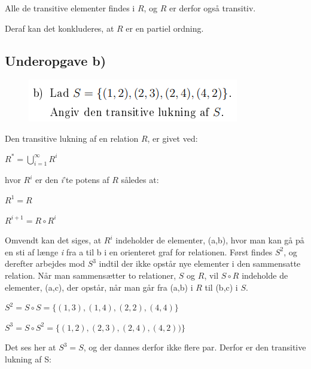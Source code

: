 \documentclass{article}
\begin{document}
Alle de transitive elementer findes i $R$, og $R$ er derfor også transitiv.

Deraf kan det konkluderes, at $R$ er en partiel ordning.

\subsection{Underopgave b)}

\begin{figure}[h]
\begin{center}
\includegraphics[scale=0.9]{2015Opgave3FormuleringB}
\end{center}
\end{figure}

Den transitive lukning af en relation $R$, er givet ved:

\begin{center}
\begin{math}
R^* = \bigcup_{i = 1}^\infty R^i
\end{math}
\end{center}

hvor $R^i$ er den \emph{i}'te potens af $R$ således at:

\begin{center}
$R^1 = R$
\end{center}
\begin{center}
$R^{i+1} = R \circ R^i$
\end{center}

Omvendt kan det siges, at $R^i$ indeholder de elementer, (a,b), hvor man kan gå på en sti af længe \emph{i} fra a til b i en orienteret graf for relationen. Først findes $S^2$, og derefter arbejdes mod $S^3$ indtil der ikke opstår nye elementer i den sammensatte relation. Når man sammensætter to relationer, $S$ og $R$, vil $S \circ R$ indeholde de elementer, (a,c), der opstår, når man går fra (a,b) i $R$ til (b,c) i $S$.

\begin{center}
\begin{math}
S^2 = S \circ S = \{(1,3), (1,4), (2,2), (4,4)\}
\end{math}
\par
\begin{math}
S^3 = S \circ S^2 = \{(1,2), (2,3), (2,4), (4,2))\}
\end{math}
\end{center}
\par 
Det ses her at $S^3 = S$, og der dannes derfor ikke flere par. Derfor er den transitive lukning af S:
\end{document}
